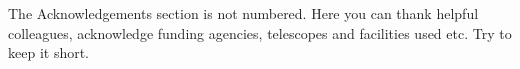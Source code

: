 \documentclass[fleqn,usenatbib]{mnras}
\begin{document}
The Acknowledgements section is not numbered. Here you can thank helpful
colleagues, acknowledge funding agencies, telescopes and facilities used etc.
Try to keep it short.









\appendix
\onecolumn




\bsp	%
\label{lastpage}
\end{document}
